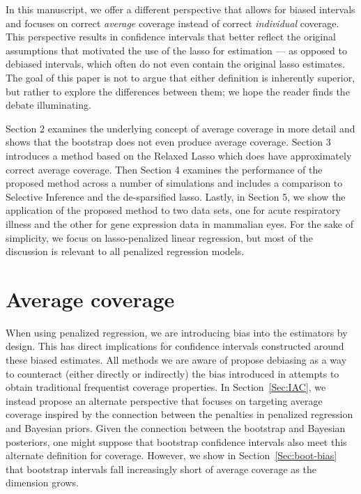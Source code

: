 In this manuscript, we offer a different perspective that allows for biased intervals and focuses on correct \emph{average} coverage instead of correct \emph{individual} coverage. This perspective results in confidence intervals that better reflect the original assumptions that motivated the use of the lasso for estimation --- as opposed to debiased intervals, which often do not even contain the original lasso estimates. The goal of this paper is not to argue that either definition is inherently superior, but rather to explore the differences between them; we hope the reader finds the debate illuminating.

Section 2 examines the underlying concept of average coverage in more detail and shows that the bootstrap does not even produce average coverage. Section 3 introduces a method based on the Relaxed Lasso which does have approximately correct average coverage. Then Section 4 examines the performance of the proposed method across a number of simulations and includes a comparison to Selective Inference and the de-sparsified lasso. Lastly, in Section 5, we show the application of the proposed method to two data sets, one for acute respiratory illness and the other for gene expression data in mammalian eyes. For the sake of simplicity, we focus on lasso-penalized linear regression, but most of the discussion is relevant to all penalized regression models.

\section{Average coverage}
\label{Sec:difficulties}


When using penalized regression, we are introducing bias into the estimators by design. This has direct implications for confidence intervals constructed around these biased estimates. All methods we are aware of propose debiasing as a way to counteract (either directly or indirectly) the bias introduced in attempts to obtain traditional frequentist coverage properties. In Section~\ref{Sec:IAC}, we instead propose an alternate perspective that focuses on targeting average coverage inspired by the connection between the penalties in penalized regression and Bayesian priors. Given the connection between the bootstrap and Bayesian posteriors, one might suppose that bootstrap confidence intervals also meet this alternate definition for coverage. However, we show in Section~\ref{Sec:boot-bias} that bootstrap intervals fall increasingly short of average coverage as the dimension grows.

